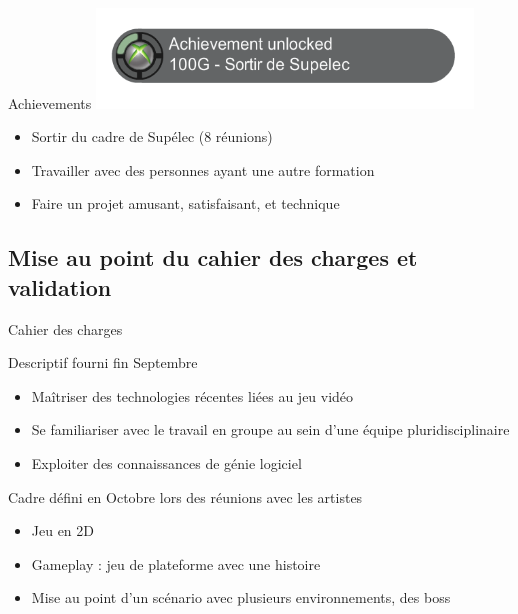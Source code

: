 \documentclass{beamer}
\begin{document}
\begin{frame}{Achievements}
    \centering
    \includegraphics[width=10cm]{assets/achievement}

    \begin{itemize}
        \item Sortir du cadre de Supélec (8 réunions)
        \pause
        \item Travailler avec des personnes ayant une autre formation
        \pause
        \item Faire un projet amusant, satisfaisant, et technique
    \end{itemize}

\end{frame}

\subsection{Mise au point du cahier des charges et validation}

\begin{frame}{Cahier des charges}

Descriptif fourni fin Septembre

\begin{itemize}
    \item Maîtriser des technologies récentes liées au jeu vidéo
    \item Se familiariser avec le travail en groupe au sein d'une équipe pluridisciplinaire
    \item Exploiter des connaissances de génie logiciel
\end{itemize}

\pause

Cadre défini en Octobre lors des réunions avec les artistes

\begin{itemize}
    \item Jeu en 2D
    \item Gameplay : jeu de plateforme avec une histoire
    \item Mise au point d'un scénario avec plusieurs environnements, des boss
\end{itemize}

\end{frame}
\end{document}
